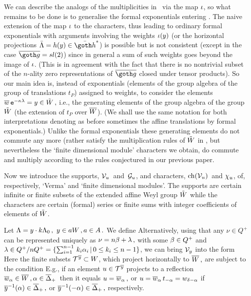 We can describe the analogs of the multiplicities in \cch\ via
the map $\iota$, so what remains to be done is to generalise the
formal exponentials entering \cch.  The naive extension of the
map $\iota$ to the characters, thus leading to ordinary formal
exponentials with arguments involving the weights $\iota(y)$ (or
the horizontal projections $\bL=h(y)
\in \bh^*$) is possible but is not consistent (except in the case
$\bgo=sl(2)$) since in general a sum of such weights  goes beyond
the image of $\iota$. (This is in agreement with the fact that
there is no  nontrivial subset of the $n$-ality zero
representations of $\bgo$ closed under tensor products).  So our
main idea is, instead of  exponentials (elements of the group
algebra of the group of translations $t_P$) assigned to  weights,
to consider the elements $ \bw\,\ts-,{\zl}=y\in \tW\,,$ i.e., the
generating elements of the group algebra of the group $\tilde W$ (the
extension of $t_P$ over $\overline W$). (We shall use the same notation
for both interpretations denoting as before sometimes the affine
translations by formal exponentials.)
%
Unlike the formal exponentials these generating elements 
do not commute any more 
(rather satisfy the multiplication rules of $\tilde W$ in \Ie,
but nevertheless  the `finite dimensional module' characters we
obtain, do commute and multiply according to the rules
conjectured in our previous paper.
\medskip

Now we introduce the supports, ${\cal V}_{u}\,$ and  $\,{\cal G}_{u}$, and 
characters, ${\rm ch}({\cal V}_{u})\,$ and $\chi_u$, of, respectively,
`Verma' and `finite dimensional modules'.  The supports are
certain infinite or finite subsets of the extended affine Weyl
group $\tilde W$ while the characters are certain (formal) series or
finite sums with integer coefficients of elements of $\tilde W$.

Let $\Lambda=y\cdot k\Lambda_0\,,\  y\in a W \,, a\in A\,.$ We define
%
\eqn{}
%
Alternatively, using that any $\nu\in Q^+$ can be represented
uniquely as $\nu=n\beta+\lambda\,,$ with some $\beta\in Q^+$ and
$\lambda\in Q^+/ n Q^+=\{\sum_{i=1}^{n-1}\, k_i \alpha_i\,|\, 0\le
k_i\le n-1\}$, we can bring ${\cal V}_y$ into the form
%
\eqn{}
%
Here the finite subsets ${\cal T}^{\overline{y}}\subset W$, which project
horizontally to $\overline W\,,$ are subject to the condition
%
\eqn{}
%
E.g., if an element $u\in {\cal T}^{\overline{y}}$ projects to a reflection
$\overline w_{\alpha}\in \overline W\,, \alpha\in \overline\Delta_+\,$ then it equals
$u=\overline w_{\alpha}\,,$ or $u=\overline w_{\alpha}\, t_{-\alpha}=w_{\delta-\alpha}$ if
$\overline{y}^{-1}(\alpha)\in \overline\Delta_+\,,$ or $\overline{y}^{-1}(-\alpha)\in \overline\Delta_+\,,$
respectively. 


